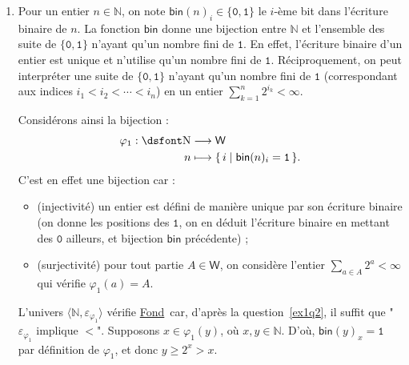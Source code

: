 \documentclass{../notes}
\newcommand\fond{\hyperref[FOND]{\textsf{Fond}}}
\newcommand\inphi[1][\relax]{\ensuremath{\mathrel{\varepsilon_{\varphi_{#1}}}}}
\begin{document}
\begin{enumerate}
\begin{description}
      \end{description}

      Soit $x \in \mathds{N}$ et supposons qu'il existe $v$ tel que $v \inphi x$, on a donc~$\varphi(x) \neq \emptyset$.
      La partie non-vide $\varphi(x)$ admet ainsi un minimum que l'on note $y \in \varphi(x)$.
      On a bien $y \inphi x$ par minimum.
      De plus, soit  $w \in \mathds{N}$ et supposons (par l'absurde) $w \inphi x$ et $w \inphi y$.
      Alors $w \in \varphi(y)$ et donc  $w < y$ par hypothèse.
      Or, $w \in \varphi(x)$. Absurde car $y$ est le minimum de $\varphi(x)$.

      D'où, avec l'implication "$\inphi$ implique $<$", l'univers $\langle \mathds{N}, \inphi \rangle$ vérifie \fond.
    \item
      Pour un entier $n \in \mathds{N}$, on note $\mathsf{bin}(n)_i \in \{\mathtt{0}, \mathtt{1}\} $ le $i$-ème bit dans l'écriture binaire de $n$.
      La fonction $\mathsf{bin}$ donne une bijection entre $\mathds{N}$ et l'ensemble des suite de $\{\mathtt{0}, \mathtt{1}\}$ n'ayant qu'un nombre fini de $\mathtt{1}$.
      En effet, l'écriture binaire d'un entier est unique et n'utilise qu'un nombre fini de $\mathtt{1}$.
      Réciproquement, on peut interpréter une suite de $\{\mathtt{0}, \mathtt{1}\}$ n'ayant qu'un nombre fini de $\mathtt{1}$ (correspondant aux indices $i_1 < i_2 < \cdots < i_n$) en un entier $\sum_{k = 1}^n 2^{i_k} < \infty$.

      Considérons ainsi la bijection :
      \begin{align*}
        \varphi_1: \mathds{N} &\longrightarrow \mathsf{W} \\
        n &\longmapsto \mleft\{\, i \;\middle|\; \mathsf{bin}(n)_i = \mathtt{1}\,\mright\} 
      .\end{align*}
      C'est en effet une bijection car :
      \begin{itemize}
        \item (injectivité) un entier est défini de manière unique par son écriture binaire (on donne les positions des $\mathtt{1}$, on en déduit l'écriture binaire en mettant des $\mathtt{0}$ ailleurs, et bijection $\mathsf{bin}$ précédente) ;
        \item (surjectivité) pour tout partie $A \in \mathsf{W}$, on considère l'entier $\sum_{a \in A} 2^a < \infty$ qui vérifie $\varphi_1(a) = A$.
      \end{itemize}

      L'univers $\langle \mathds{N}, \inphi[1] \rangle$ vérifie \fond\ car, d'après la question~\ref{ex1q2}, il suffit que "$\inphi[1]$ implique  $<$".
      Supposons $x \in \varphi_1(y)$, où $x, y \in \mathds{N}$.
      D'où, $\mathsf{bin}(y)_x = \mathtt{1}$ par définition de $\varphi_1$, et donc $y \ge 2^x > x$.


\end{enumerate}
\end{document}
